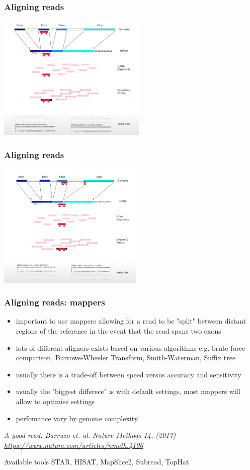 \documentclass{beamer}\usepackage[]{graphicx}\usepackage[]{color}
\begin{document}
\begin{frame}
\frametitle{Aligning reads}
\centering
\includegraphics[height=6cm]{Images/map1.png}
\end{frame}

\begin{frame}
\frametitle{Aligning reads}
\centering
\includegraphics[height=6cm]{Images/map2.png}
\end{frame}

\begin{frame}
\frametitle{Aligning reads: mappers}
\footnotesize
\begin{itemize}
  \item important to use mappers allowing for a read to be "split" between distant regions of the reference in the event that the read spans two exons
  \item lots of different aligners exists based on various algorithms e.g. brute force comparison, Burrows-Wheeler Transform, Smith-Waterman, Suffix tree
  \item usually there is a trade-off between speed versus accuracy and sensitivity
  \item usually the "biggest differece" is with default settings, most mappers will allow to optimise settings
  \item perfomance vary by genome complexity
\end{itemize}

\textit{A good read: Barruzo et. al. Nature Methods 14, (2017) \href{Simulation-based comprehensive benchmarking of RNA-seq aligners}{https://www.nature.com/articles/nmeth.4106}}

\vspace{5mm}
\begin{block}{Available tools}
STAR, HISAT, MapSlice2, Subread, TopHat
\end{block}
\end{frame}
\end{document}
